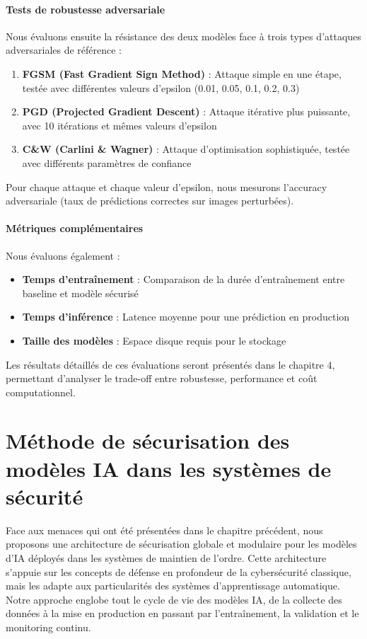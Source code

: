 \paragraph{Tests de robustesse adversariale}
Nous évaluons ensuite la résistance des deux modèles face à trois types d'attaques adversariales de référence :

\begin{enumerate}
    \item \textbf{FGSM (Fast Gradient Sign Method)} : Attaque simple en une étape, testée avec différentes valeurs d'epsilon (0.01, 0.05, 0.1, 0.2, 0.3)
    \item \textbf{PGD (Projected Gradient Descent)} : Attaque itérative plus puissante, avec 10 itérations et mêmes valeurs d'epsilon
    \item \textbf{C\&W (Carlini \& Wagner)} : Attaque d'optimisation sophistiquée, testée avec différents paramètres de confiance
\end{enumerate}

Pour chaque attaque et chaque valeur d'epsilon, nous mesurons l'accuracy adversariale (taux de prédictions correctes sur images perturbées).

\paragraph{Métriques complémentaires}
Nous évaluons également :
\begin{itemize}
    \item \textbf{Temps d'entraînement} : Comparaison de la durée d'entraînement entre baseline et modèle sécurisé
    \item \textbf{Temps d'inférence} : Latence moyenne pour une prédiction en production
    \item \textbf{Taille des modèles} : Espace disque requis pour le stockage
\end{itemize}

Les résultats détaillés de ces évaluations seront présentés dans le chapitre 4, permettant d'analyser le trade-off entre robustesse, performance et coût computationnel.

\section{Méthode de sécurisation des modèles IA dans les systèmes de sécurité}

Face aux menaces qui ont été présentées dans le chapitre précédent, nous proposons une architecture de sécurisation globale et modulaire pour les modèles d'IA déployés dans les systèmes de maintien de l'ordre. Cette architecture s'appuie sur les concepts de défense en profondeur de la cybersécurité classique, mais les adapte aux particularités des systèmes d'apprentissage automatique. Notre approche englobe tout le cycle de vie des modèles IA, de la collecte des données à la mise en production en passant par l'entraînement, la validation et le monitoring continu.

